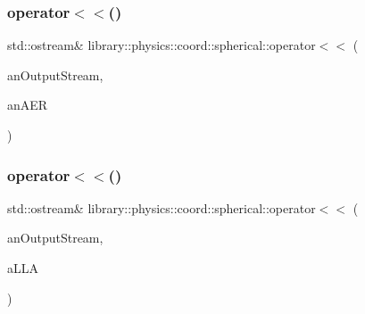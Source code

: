 \subsubsection{\texorpdfstring{operator$<$$<$()}{operator<<()}\hspace{0.1cm}{\footnotesize\ttfamily [1/2]}}
{\footnotesize\ttfamily std\+::ostream\& library\+::physics\+::coord\+::spherical\+::operator$<$$<$ (\begin{DoxyParamCaption}\item[{std\+::ostream \&}]{an\+Output\+Stream,  }\item[{const \hyperlink{classlibrary_1_1physics_1_1coord_1_1spherical_1_1_a_e_r}{A\+ER} \&}]{an\+A\+ER }\end{DoxyParamCaption})}

\mbox{\label{namespacelibrary_1_1physics_1_1coord_1_1spherical_ae657b9eb35f35ee5db9f1a50e64f77a5}} 
\subsubsection{\texorpdfstring{operator$<$$<$()}{operator<<()}\hspace{0.1cm}{\footnotesize\ttfamily [2/2]}}
{\footnotesize\ttfamily std\+::ostream\& library\+::physics\+::coord\+::spherical\+::operator$<$$<$ (\begin{DoxyParamCaption}\item[{std\+::ostream \&}]{an\+Output\+Stream,  }\item[{const \hyperlink{classlibrary_1_1physics_1_1coord_1_1spherical_1_1_l_l_a}{L\+LA} \&}]{a\+L\+LA }\end{DoxyParamCaption})}

